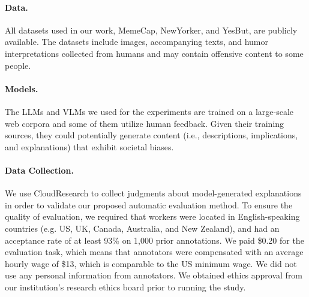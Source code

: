 \paragraph{Data.}
All datasets used in our work, MemeCap, NewYorker, and YesBut, are publicly available. The datasets include images, accompanying texts, and humor interpretations collected from humans and may contain offensive content to some people.

\paragraph{Models.} 
The LLMs and VLMs we used for the experiments are trained on a large-scale web corpora and some of them utilize human feedback. Given their training sources, they could potentially generate content (i.e., descriptions, implications, and explanations) that exhibit societal biases.

\paragraph{Data Collection.} 
We use CloudResearch to collect judgments about model-generated explanations in order to validate our proposed  automatic evaluation method.  To ensure the quality of evaluation, we required that workers were located in English-speaking countries (e.g. US, UK, Canada, Australia, and New Zealand), and had an acceptance rate of at least 93\% on 1,000 prior annotations. We paid \$0.20 for the evaluation task, which means that annotators were compensated with an average hourly wage of \$13, which is comparable to the US minimum wage. We did not use any personal information from annotators. We obtained ethics approval from our institution's research ethics board prior to running the study. 